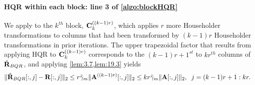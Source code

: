 \paragraph{HQR within each block: line 3 of \cref{algo:blockHQR}}
We apply  to the $k^{th}$ block, $\mathbf{C}_k^{((k-1)r)}$, which applies $r$ more Householder transformations to columns that had been transformed by $(k-1)r$ Householder transformations in prior iterations.
The upper trapezoidal factor that results from applying HQR to $\mathbf{C}_{k}^{((k-1)r)}$ corresponds to the $(k-1)r+1^{st}$ to $kr^{th}$ columns of $\hat{\mathbf{R}}_{BQR}$, and applying \cref{lem:3.7,lem:19.3} yields
\begin{equation*}
	\|\hat{\mathbf{R}}_{BQR}[:,j]-\mathbf{R}[:,j]\|_2 \leq r\tilde{\gamma}_{m}\|\mathbf{A}^{((k-1)r)}[:,j]\|_2\leq kr\tilde{\gamma}_{m}\|\mathbf{A}[:,j]\|_2,\;\; j=(k-1)r+1:kr.
\end{equation*}
